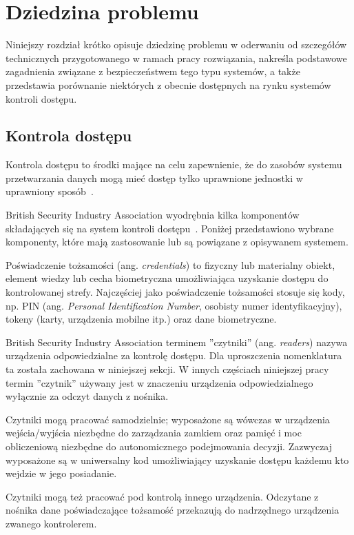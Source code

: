 \chapter{Dziedzina problemu}
\label{chap:problem-domain}

	Niniejszy rozdział krótko opisuje dziedzinę problemu w oderwaniu od szczegółów technicznych przygotowanego w ramach pracy rozwiązania, nakreśla podstawowe zagadnienia związane z bezpieczeństwem tego typu systemów, a także przedstawia porównanie niektórych z obecnie dostępnych na rynku systemów kontroli dostępu.

	\section{Kontrola dostępu}

		Kontrola dostępu to środki mające na celu zapewnienie, że do zasobów systemu przetwarzania danych mogą mieć dostęp tylko uprawnione jednostki w uprawniony sposób~\cite{pkn2002}.

		British Security Industry Association wyodrębnia kilka komponentów składających się na system kontroli dostępu~\cite{bsia2016}. Poniżej przedstawiono wybrane komponenty, które mają zastosowanie lub są powiązane z opisywanem systemem.

		Poświadczenie tożsamości (ang. \textit{credentials}) to fizyczny lub materialny obiekt, element wiedzy lub cecha biometryczna umożliwiająca uzyskanie dostępu do kontrolowanej strefy. Najczęściej jako poświadczenie tożsamości stosuje się kody, np. PIN (ang. \textit{Personal Identification Number}, osobisty numer identyfikacyjny), tokeny (karty, urządzenia mobilne itp.) oraz dane biometryczne.~\cite{bsia2016}

		British Security Industry Association terminem ''czytniki'' (ang. \textit{readers}) nazywa urządzenia odpowiedzialne za kontrolę dostępu. Dla uproszczenia nomenklatura ta została zachowana w niniejszej sekcji. W innych częściach niniejszej pracy termin ''czytnik'' używany jest w znaczeniu urządzenia odpowiedzialnego wyłącznie za odczyt danych z nośnika.

		Czytniki mogą pracować samodzielnie; wyposażone są wówczas w urządzenia wejścia/wyjścia niezbędne do zarządzania zamkiem oraz pamięć i moc obliczeniową niezbędne do autonomicznego podejmowania decyzji. Zazwyczaj wyposażone są w uniwersalny kod umożliwiający uzyskanie dostępu każdemu kto wejdzie w jego posiadanie.~\cite{bsia2016}

		Czytniki mogą też pracować pod kontrolą innego urządzenia. Odczytane z nośnika dane poświadczające tożsamość przekazują do nadrzędnego urządzenia zwanego kontrolerem.~\cite{bsia2016}

